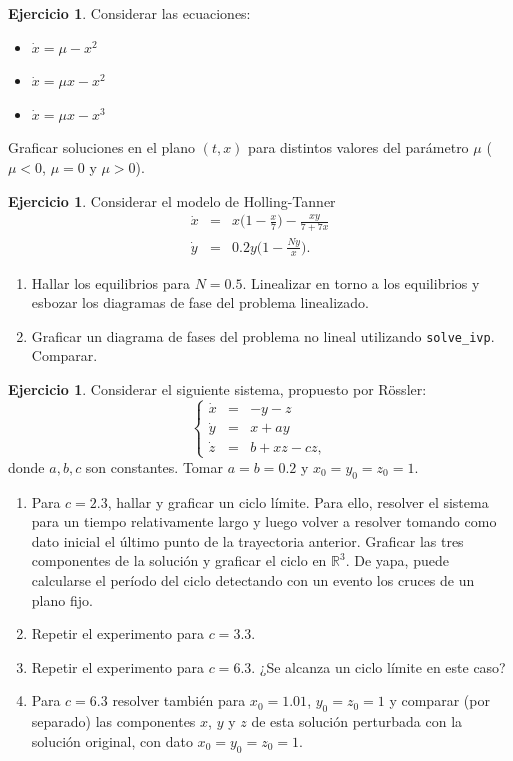 \documentclass[12pt, a4paper]{amsbook}
\newcommand{\R}{{\mathbb R}}
\theoremstyle{remark}
\theoremstyle{definition}
\newtheorem{ejer}[teo]{Ejercicio}
\numberwithin{section}{chapter}
\numberwithin{subsection}{section}
\numberwithin{equation}{section}
\numberwithin{figure}{chapter}
\begin{document}
\begin{ejer} Considerar las ecuaciones: 
    \begin{itemize}
        \item $\dot{x} = \mu - x^2$
        \item $\dot{x} = \mu x - x^2$
        \item $\dot{x} = \mu x - x^3$
    \end{itemize}
    Graficar soluciones en el plano $(t,x)$ para distintos valores del parámetro $\mu$ ($\mu<0$, $\mu=0$ y $\mu>0$).
\end{ejer}

\begin{ejer} Considerar el modelo de Holling-Tanner 
\[\begin{array}{rcl}
\dot{x}&=&x\Big(1-\frac{x}{7}\Big) -\frac{xy}{7+7x} \\ 
\dot{y}&=&0.2y\Big(1-\frac{Ny}{x}\Big).
\end{array}\]
\begin{enumerate}
\item Hallar los equilibrios para $N=0.5$. Linealizar en torno a los equilibrios y esbozar los diagramas de fase del problema linealizado. 
\item Graficar un diagrama de fases del problema no lineal utilizando \lstinline{solve_ivp}. Comparar.
\end{enumerate}
\end{ejer} 

\begin{ejer} Considerar el siguiente sistema, propuesto por R\"ossler:
\[\left\{\begin{array}{rcl}
        \dot{x} &=& -y-z \\
        \dot{y} &=& x+ay \\
        \dot{z} &=& b+xz-cz,
        \end{array}\right.\]
donde $a,b,c$ son constantes. Tomar $a=b=0.2$ y $x_0=y_0=z_0=1$. 
\begin{enumerate}
    \item Para $c=2.3$, hallar y graficar un ciclo límite. Para ello, resolver el sistema para un tiempo relativamente largo y luego volver a resolver tomando como dato inicial el último punto de la trayectoria anterior. Graficar las tres componentes de la solución y graficar el ciclo en $\R^3$. De yapa, puede calcularse el período del ciclo detectando con un evento los cruces de un plano fijo.
    \item Repetir el experimento para $c=3.3$.
    \item Repetir el experimento para $c=6.3$. ¿Se alcanza un ciclo límite en este caso?
    \item Para $c=6.3$ resolver también para $x_0=1.01$, $y_0=z_0=1$ y comparar (por separado) las componentes $x$, $y$ y $z$ de esta solución perturbada con la solución original, con dato $x_0=y_0=z_0=1$. 
\end{enumerate}
\end{ejer}
\end{document}

